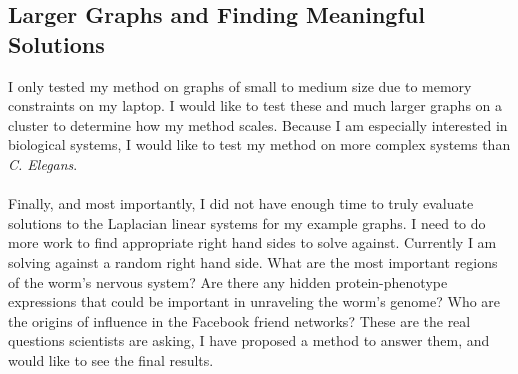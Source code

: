 \documentclass{article}
\begin{document}
\subsection{Larger Graphs and Finding Meaningful Solutions}
I only tested my method on graphs of small to medium size due to memory constraints on my laptop. I would like to test these and much larger graphs on a cluster to determine how my method scales. Because I am especially interested in biological systems, I would like to test my method on more complex systems than \textit{C. Elegans}.\\
 \\
Finally, and most importantly, I did not have enough time to truly evaluate solutions to the Laplacian linear systems for my example graphs. I need to do more work to find appropriate right hand sides to solve against. Currently I am solving against a random right hand side. What are the most important regions of the worm's nervous system? Are there any hidden protein-phenotype expressions that could be important in unraveling the worm's genome? Who are the origins of influence in the Facebook friend networks? These are the real questions scientists are asking, I have proposed a method to answer them, and would like to see the final results.
%
%
\end{document}
